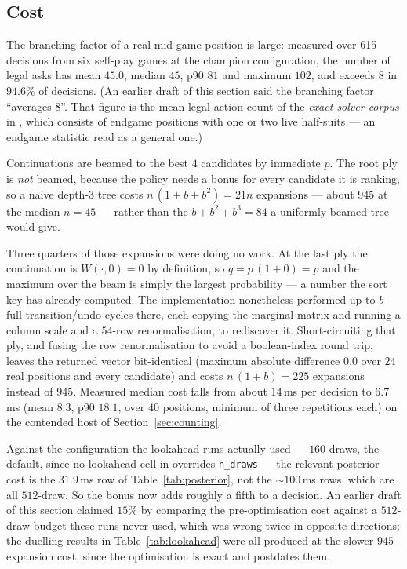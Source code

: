 \documentclass[11pt,a4paper]{article}
\begin{document}
\subsection{Cost}
\label{sec:lookahead-cost}

The branching factor of a real mid-game position is large: measured over 615
decisions from six self-play games at the champion configuration, the number of
legal asks has mean $45.0$, median $45$, p90 $81$ and maximum $102$, and exceeds
$8$ in $94.6\%$ of decisions. (An earlier draft of this section said the
branching factor ``averages 8''. That figure is the mean legal-action count of
the \emph{exact-solver corpus} in
, which consists of endgame positions
with one or two live half-suits --- an endgame statistic read as a general one.)

Continuations are beamed to the best $4$ candidates by immediate $p$. The root
ply is \emph{not} beamed, because the policy needs a bonus for every candidate it
is ranking, so a naive depth-3 tree costs $n\,(1 + b + b^2) = 21n$ expansions ---
about $945$ at the median $n = 45$ --- rather than the $b + b^2 + b^3 = 84$ a
uniformly-beamed tree would give.

Three quarters of those expansions were doing no work. At the last ply the
continuation is $W(\cdot, 0) = 0$ by definition, so $q = p\,(1 + 0) = p$ and the
maximum over the beam is simply the largest probability --- a number the sort key
has already computed. The implementation nonetheless performed up to $b$ full
transition/undo cycles there, each copying the marginal matrix and running a
column scale and a $54$-row renormalisation, to rediscover it. Short-circuiting
that ply, and fusing the row renormalisation to avoid a boolean-index round trip,
leaves the returned vector bit-identical (maximum absolute difference $0.0$ over
$24$ real positions and every candidate) and costs $n\,(1 + b) = 225$ expansions
instead of $945$. Measured median cost falls from about $14$\,ms per decision to
$6.7$\,ms (mean $8.3$, p90 $18.1$, over $40$ positions, minimum of three
repetitions each) on the contended host of Section~\ref{sec:counting}.

Against the configuration the lookahead runs actually used --- $160$ draws, the
 default, since no lookahead cell in
 overrides \texttt{n\_draws} --- the relevant
posterior cost is the $31.9$\,ms row of Table~\ref{tab:posterior}, not the
$\sim\!100$\,ms rows, which are all $512$-draw. So the bonus now adds roughly a
fifth to a decision. An earlier draft of this section claimed $15\%$ by comparing
the pre-optimisation cost against a $512$-draw budget these runs never used,
which was wrong twice in opposite directions; the duelling results in
Table~\ref{tab:lookahead} were all produced at the slower $945$-expansion cost,
since the optimisation is exact and postdates them.
\end{document}
